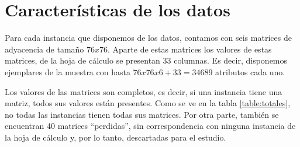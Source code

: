 \section{Características de los datos}
Para cada instancia que disponemos de los datos, contamos con seis matrices de adyacencia de tamaño $76 x 76$. Aparte de estas matrices los valores de estas matrices, de la hoja de cálculo se presentan 33 columnas. Es decir, disponemos ejemplares de la muestra con hasta $76 x 76 x 6 + 33 = 34689$ atributos cada uno. 

Los valores de las matrices son completos, es decir, si una instancia tiene una matriz, todos sus valores están presentes. Como se ve en la tabla \ref{table:totales}, no todas las instancias tienen todas sus matrices. Por otra parte, también se encuentran 40 matrices ``perdidas'', sin correspondencia con ninguna instancia de la hoja de cálculo y, por lo tanto, descartadas para el estudio. 

